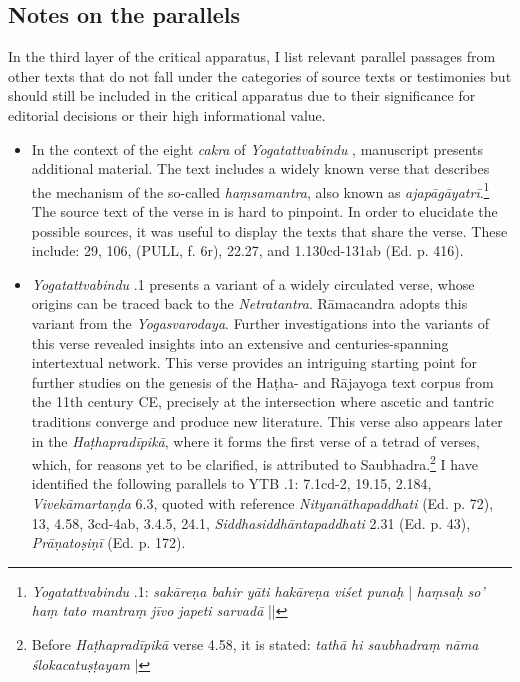 \subsection{Notes on the parallels}

In the third layer of the critical apparatus, I list relevant parallel passages from other texts that do not fall under the categories of source texts or testimonies but should still be included in the critical apparatus due to their significance for editorial decisions or their high informational value.

\begin{itemize}

\item In the context of the eight \emph{cakra} of \emph{Yogatattvabindu} , manuscript  presents additional material. The text includes a widely known verse that describes the mechanism of the so-called \textit{haṃsamantra}, also known as \textit{ajapāgāyatrī}.\footnote{\emph{Yogatattvabindu} .1: \textit{sakāreṇa bahir yāti hakāreṇa viśet punaḥ} | \textit{haṃsaḥ so' haṃ tato mantraṃ jīvo japeti sarvadā} ||} The source text of the verse in  is hard to pinpoint. In order to elucidate the possible sources, it was useful to display the texts that share the verse. These include: \approx {} 29, \approx {} 106, \approx {} (PULL, f. 6r), \approx {} 22.27, and \approx {} 1.130cd-131ab (Ed. p. 416).
  
\item \emph{Yogatattvabindu} .1 presents a variant of a widely circulated verse, whose origins can be traced back to the \emph{Netratantra}. Rāmacandra adopts this variant from the \emph{Yogasvarodaya}. Further investigations into the variants of this verse revealed insights into an extensive and centuries-spanning intertextual network. This verse provides an intriguing starting point for further studies on the genesis of the Haṭha- and Rājayoga text corpus from the 11th century CE, precisely at the intersection where ascetic and tantric traditions converge and produce new literature. This verse also appears later in the \emph{Haṭhapradīpikā}, where it forms the first verse of a tetrad of verses, which, for reasons yet to be clarified, is attributed to Saubhadra.\footnote{Before \emph{Haṭhapradīpikā} verse 4.58, it is stated: \emph{tathā hi saubhadraṃ nāma ślokacatuṣṭayam} |} I have identified the following parallels to YTB .1: \approx {} 7.1cd-2, \approx {} 19.15, \approx {} 2.184, \approx \emph{Vivekāmartaṇḍa} 6.3, \approx {} quoted with reference \emph{Nityanāthapaddhati} (Ed. p. 72), \approx {} 13, \approx {} 4.58, \approx {} 3cd-4ab, \approx {} 3.4.5, \approx {} 24.1, \approx \emph{Siddhasiddhāntapaddhati} 2.31 (Ed. p. 43), \approx \emph{Prāṇatoṣiṇī} (Ed. p. 172).


\end{itemize}
